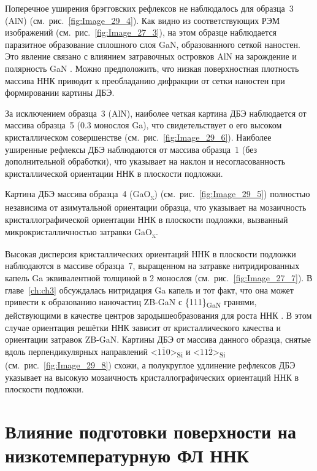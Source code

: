 Поперечное уширения брэгговских рефлексов не наблюдалось для образца~3 (AlN)
(см.~рис.~\cref{fig:Image_29_4}). Как видно из соответствующих РЭМ изображений
(см.~рис.~\cref{fig:Image_27_3}), на этом образце наблюдается паразитное
образование сплошного слоя GaN, образованного сеткой наностен. Это явление
связано с влиянием затравочных островков AlN на зарождение и полярность GaN
\cite{Zhong2018}. Можно предположить, что низкая поверхностная плотность
массива ННК приводит к преобладанию дифракции от сетки наностен при
формировании картины ДБЭ.

За исключением образца~3 (AlN), наиболее четкая картина ДБЭ наблюдается от
массива образца~5 (0.3 монослоя Ga), что свидетельствует о его высоком
кристаллическом совершенстве (см.~рис.~\cref{fig:Image_29_6}). Наиболее
уширенные рефлексы ДБЭ наблюдаются от массива образца~1 (без дополнительной
обработки), что указывает на наклон и несогласованность кристаллической
ориентации ННК в плоскости подложки.

Картина ДБЭ массива образца~4 (GaO\textsubscript{x})
(см.~рис.~\cref{fig:Image_29_5}) полностью независима от азимутальной
ориентации образца, что указывает на мозаичность кристаллографической
ориентации ННК в плоскости подложки, вызванный микрокристалличностью затравки
GaO\textsubscript{x}.

Высокая дисперсия кристаллических ориентаций ННК в плоскости подложки
наблюдаются в массиве образца~7, выращенном на затравке нитридированных капель
Ga эквивалентной толщиной в 2 монослоя (см.~рис.~\cref{fig:Image_27_7}). В
главе~\cref{ch:ch3} обсуждалась нитридация Ga капель и тот факт, что она может
привести к образованию наночастиц ZB-GaN с \{111\}\textsubscript{GaN} гранями,
действующими в качестве центров зародышеобразования для роста ННК
\cite{Fedorov2018}. В этом случае ориентация решётки ННК зависит от
кристаллического качества и ориентации затравок ZB-GaN. Картины ДБЭ от массива
данного образца, снятые вдоль перпендикулярных направлений
<\(1\overline{1}0\)>\textsubscript{Si} и <\(11\overline{2}\)>\textsubscript{Si}
(см.~рис.~\cref{fig:Image_29_8}) схожи, а полукруглое удлинение рефлексов ДБЭ
указывает на высокую мозаичность кристаллографических ориентаций ННК в
плоскости подложки.

\section{Влияние подготовки поверхности на низкотемпературную ФЛ ННК}\label{sec:ch3/sec7}

